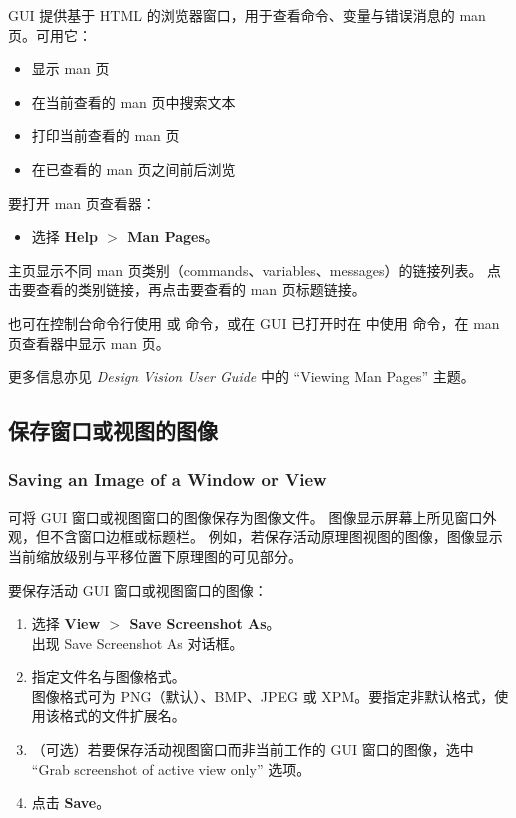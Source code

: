 GUI 提供基于 HTML 的浏览器窗口，用于查看命令、变量与错误消息的 man 页。可用它：
\begin{itemize}
  \item 显示 man 页
  \item 在当前查看的 man 页中搜索文本
  \item 打印当前查看的 man 页
  \item 在已查看的 man 页之间前后浏览
\end{itemize}

要打开 man 页查看器：
\begin{itemize}
  \item 选择 \textbf{Help $>$ Man Pages}。
\end{itemize}
主页显示不同 man 页类别（commands、variables、messages）的链接列表。
点击要查看的类别链接，再点击要查看的 man 页标题链接。

也可在控制台命令行使用  或  命令，或在 GUI 已打开时在  中使用  命令，在 man 页查看器中显示 man 页。

更多信息亦见 \textit{Design Vision User Guide} 中的 ``Viewing Man Pages'' 主题。

\subsection{保存窗口或视图的图像}
\subsubsection*{Saving an Image of a Window or View}

可将 GUI 窗口或视图窗口的图像保存为图像文件。
图像显示屏幕上所见窗口外观，但不含窗口边框或标题栏。
例如，若保存活动原理图视图的图像，图像显示当前缩放级别与平移位置下原理图的可见部分。

要保存活动 GUI 窗口或视图窗口的图像：
\begin{enumerate}
  \item 选择 \textbf{View $>$ Save Screenshot As}。\\
        出现 Save Screenshot As 对话框。
  \item 指定文件名与图像格式。\\
        图像格式可为 PNG（默认）、BMP、JPEG 或 XPM。要指定非默认格式，使用该格式的文件扩展名。
  \item （可选）若要保存活动视图窗口而非当前工作的 GUI 窗口的图像，选中 ``Grab screenshot of active view only'' 选项。
  \item 点击 \textbf{Save}。
\end{enumerate}

